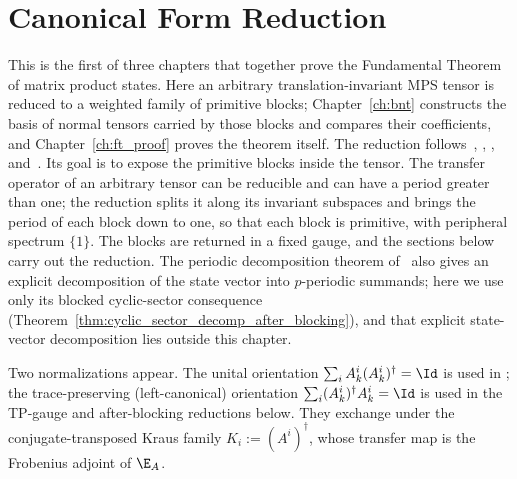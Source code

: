 \chapter{Canonical Form Reduction}\label{ch:canonical}

This is the first of three chapters that together prove the Fundamental Theorem
of matrix product states. Here an arbitrary translation-invariant MPS tensor is
reduced to a weighted family of primitive blocks; Chapter~\ref{ch:bnt} constructs
the basis of normal tensors carried by those blocks and compares their
coefficients, and Chapter~\ref{ch:ft_proof} proves the theorem itself. The
reduction follows~\cite{PerezGarcia2007Matrix}, \cite{Cirac2016MPDO_arXiv},
\cite{Cirac2021Matrix}, and~\cite[Chapter~6]{Wolf2012Quantum}. Its goal is to expose the primitive blocks
inside the tensor. The transfer operator of an arbitrary tensor can be reducible
and can have a period greater than one; the reduction splits it along its
invariant subspaces and brings the period of each block down to one, so that each
block is primitive, with peripheral spectrum $\{1\}$. The blocks are returned in a
fixed gauge, and the sections below carry out the reduction. The periodic
decomposition theorem of~\cite[Theorem~5]{PerezGarcia2007Matrix} also gives an
explicit decomposition of the state vector into $p$-periodic summands; here we
use only its blocked cyclic-sector consequence
(Theorem~\ref{thm:cyclic_sector_decomp_after_blocking}), and that explicit
state-vector decomposition lies outside this chapter.

Two normalizations appear. The unital orientation
$\sum_i A_k^i(A_k^i)^\dagger=\Id$ is used in
\cite[Theorem~4]{PerezGarcia2007Matrix}; the trace-preserving
(left-canonical) orientation $\sum_i (A_k^i)^\dagger A_k^i=\Id$ is used in the
TP-gauge and after-blocking reductions below. They exchange under the
conjugate-transposed Kraus family $K_i:=(A^i)^\dagger$, whose transfer map is the
Frobenius adjoint of $\E_A$.

